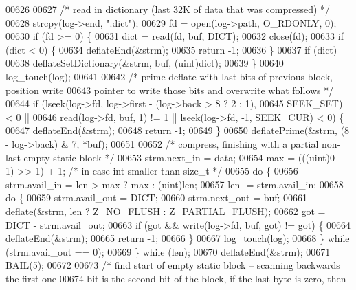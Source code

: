 \begin{DoxyCode}
00626 
00627         \textcolor{comment}{/* read in dictionary (last 32K of data that was compressed) */}
00628         strcpy(log->end, \textcolor{stringliteral}{".dict"});
00629         fd = open(log->path, O\_RDONLY, 0);
00630         \textcolor{keywordflow}{if} (fd >= 0) \{
00631             dict = read(fd, buf, DICT);
00632             close(fd);
00633             \textcolor{keywordflow}{if} (dict < 0) \{
00634                 deflateEnd(&strm);
00635                 \textcolor{keywordflow}{return} -1;
00636             \}
00637             \textcolor{keywordflow}{if} (dict)
00638                 deflateSetDictionary(&strm, buf, (uint)dict);
00639         \}
00640         log\_touch(log);
00641 
00642         \textcolor{comment}{/* prime deflate with last bits of previous block, position write}
00643 \textcolor{comment}{           pointer to write those bits and overwrite what follows */}
00644         \textcolor{keywordflow}{if} (lseek(log->fd, log->first - (log->back > 8 ? 2 : 1),
00645                 SEEK\_SET) < 0 ||
00646             read(log->fd, buf, 1) != 1 || lseek(log->fd, -1, SEEK\_CUR) < 0) \{
00647             deflateEnd(&strm);
00648             \textcolor{keywordflow}{return} -1;
00649         \}
00650         deflatePrime(&strm, (8 - log->back) & 7, *buf);
00651 
00652         \textcolor{comment}{/* compress, finishing with a partial non-last empty static block */}
00653         strm.next\_in = data;
00654         max = (((uint)0 - 1) >> 1) + 1; \textcolor{comment}{/* in case int smaller than size\_t */}
00655         \textcolor{keywordflow}{do} \{
00656             strm.avail\_in = len > max ? max : (uint)len;
00657             len -= strm.avail\_in;
00658             \textcolor{keywordflow}{do} \{
00659                 strm.avail\_out = DICT;
00660                 strm.next\_out = buf;
00661                 deflate(&strm, len ? Z\_NO\_FLUSH : Z\_PARTIAL\_FLUSH);
00662                 got = DICT - strm.avail\_out;
00663                 \textcolor{keywordflow}{if} (got && write(log->fd, buf, got) != got) \{
00664                     deflateEnd(&strm);
00665                     \textcolor{keywordflow}{return} -1;
00666                 \}
00667                 log\_touch(log);
00668             \} \textcolor{keywordflow}{while} (strm.avail\_out == 0);
00669         \} \textcolor{keywordflow}{while} (len);
00670         deflateEnd(&strm);
00671         BAIL(5);
00672 
00673         \textcolor{comment}{/* find start of empty static block -- scanning backwards the first one}
00674 \textcolor{comment}{           bit is the second bit of the block, if the last byte is zero, then}

\end{DoxyCode}
